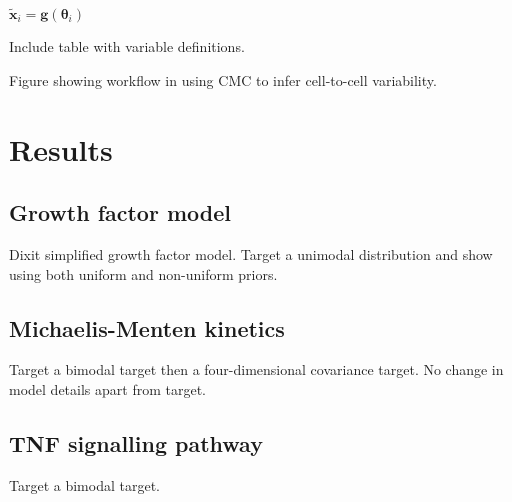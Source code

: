 \documentclass[10pt,letterpaper]{article}
\begin{document}
\begin{algorithm}[H]
	\texttt{\\}
	\begin{algorithmic}
		\State $\tilde{\boldsymbol{x}}_i = \boldsymbol{g}(\boldsymbol{\theta}_i)$ 
		\EndFor
		 
		\State {} 
		\Else
		\State {}
		\EndIf
		\EndProcedure
	\end{algorithmic}

	\caption{Pseudocode for the Contour Monte Carlo algorithm for sampling from the posterior input distribution of eq. (\ref{eq:posterior_input}). Parameters that may be vectors are shown in bold. Here we provide code for the Random Walk Metropolis algorithm for the MCMC sampling but for the examples in \S \ref{sec:results}, we use an adaptive MCMC algorithm \cite{johnstone2016uncertainty}.}\label{alg:cmc}
\end{algorithm}


Include table with variable definitions.

Figure showing workflow in using CMC to infer cell-to-cell variability.


\section{Results}\label{sec:results}

\subsection{Growth factor model}
Dixit simplified growth factor model. Target a unimodal distribution and show using both uniform and non-uniform priors.

\subsection{Michaelis-Menten kinetics}
Target a bimodal target then a four-dimensional covariance target. No change in model details apart from target.

\subsection{TNF signalling pathway}
Target a bimodal target.
\end{document}

